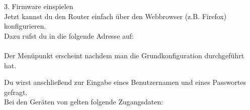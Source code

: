 



{\Large 3. Firmware einspielen} \\

Jetzt kannst du den Router einfach über den Webbrowser (z.B. Firefox) konfigurieren.\\ 
Dazu rufst du in die folgende Adresse auf: \\

 \\

Der Menüpunkt  erscheint nachdem man die Grundkonfiguration durchgeführt hat.

Du wirst anschließend zur Eingabe eines Benutzernamen und eines Passwortes gefragt. \\
Bei den Geräten von \printVendor gelten folgende Zugangsdaten:

 \\



























